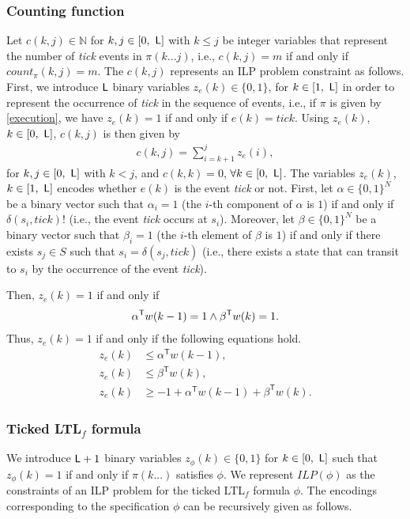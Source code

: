 \documentclass[journal,twoside,web]{IEEEtran}
\newcommand{\req}[1]{\eqref{#1}}
\newcommand{\Len}{{\sf L}}
\begin{document}
\subsubsection{Counting function}
Let $c (k, j) \in \mathbb{N}$ for $k, j \in [0,\ \Len]$ with $k\leq j$ be integer variables that represent the number of \textit{tick} events in
%
%
$\pi(k...j)$, i.e., $c(k,j) = m$ if and only if $count_\pi(k,j) = m$. The $c(k,j)$ represents an ILP problem constraint as follows. First, we introduce $\Len$ binary variables $z_e (k) \in \{0, 1\}$, for $k\in[1,\ \Len]$ in order to represent the occurrence of \textit{tick} in the sequence of events, i.e., if $\pi$ is given by \req{execution}, we have $z_e(k) = 1$ if and only if $e(k) = \textit{tick}$. Using $z_e (k)$, $k \in [0,\ \Len]$, $c(k, j)$ is then given by
\begin{align}\label{ckj}
c (k, j) =   \sum^j _{i = k+1} z_e (i),
\end{align}
for $k, j \in [0,\ \Len]$ with $k < j$, and $c (k, k) = 0$, $\forall k\in[0,\  \Len]$. 
The variables $z_e(k)$, $k\in[1,\ \Len]$ encodes whether $e(k)$ is the event \textit{tick} or not. First, let $\alpha \in \{0, 1\}^{N}$ be a binary vector such that $\alpha_i = 1$ (the $i$-th component of $\alpha$ is $1$) if and only if $\delta (s_i, \textit{tick}) !$ (i.e., the event \textit{tick} occurs at $s_i$). Moreover, let $\beta \in \{0, 1\}^{N}$ be a binary vector such that $\beta_i = 1$ (the $i$-th element of $\beta$ is $1$) if and only if there exists $s_{j} \in S$ such that $s_i = \delta (s_{j}, \textit{tick})$ (i.e., there exists a state that can transit to $s_i$ by the occurrence of the event \textit{tick}).

Then, $z_e(k)=1$ if and only if
\begin{align}%
\alpha^\mathsf{T} w (k-1) = 1 \wedge \beta^\mathsf{T} w (k) =1. \notag 
\end{align}
Thus, $z_e(k)=1$ if and only if the following equations hold.
\begin{align}
z_e (k) &\leq \alpha^\mathsf{T} w (k-1),\label{zek1} \\
z_e (k) &\leq \beta^\mathsf{T} w (k), \label{zek2}  \\
z_e (k) & \geq -1 + \alpha^\mathsf{T} w (k-1) + \beta^\mathsf{T} w (k).\label{zek3}
\end{align}
%
\subsubsection{Ticked LTL$_f$ formula}\label{encLTL}
%   
We introduce $\Len+1$ binary variables $z_{\phi}(k) \in \{0,1\}$ for $k \in [0,\ \Len]$ such that $z_{\phi}(k)=1$ if and only if $\pi (k...)$ satisfies $\phi$.
We represent $\textit{ILP}(\phi)$ as the constraints of an ILP problem for the ticked LTL$_f$ formula $\phi$.
The encodings corresponding to the specification $\phi$ can be recursively given as follows.
%
%
\end{document}
